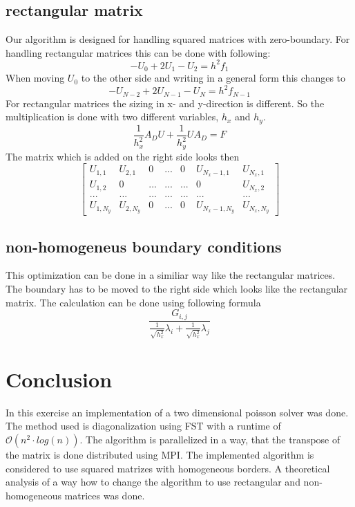 \documentclass{article}
\begin{document}
\subsection{rectangular matrix}
Our algorithm is designed for handling squared matrices with zero-boundary. For handling rectangular matrices this can be done with following:
\begin{equation}
-U_0+2U_1-U_2=h^2f_1
\end{equation}
When moving $U_0$ to the other side and writing in a general form this changes to
\begin{equation}
-U_{N-2}+2U_{N-1}-U_N=h^2f_{N-1}
\end{equation}
For rectangular matrices the sizing in x- and y-direction is different. So the multiplication is done with two different variables, $h_x$ and $h_y$.
\begin{equation}
\frac{1}{h_x^2}A_DU+\frac{1}{h_y^2}UA_D=F
\end{equation}
The matrix which is added on the right side looks then
$$
\begin{bmatrix}
U_{1,1} & U_{2,1} & 0 & ... & 0 & U_{N_x-1,1} & U_{N_x,1} \\
U_{1,2} & 0 & ... & ... & ... & 0 & U_{N_x,2} \\
... & ... & ... & ... &... & ... & ... \\
U_{1,N_y} & U_{2,N_y} & 0 & ... & 0 & U_{N_x-1,N_y} & U_{N_x,N_y} 
\end{bmatrix}
$$
\subsection{non-homogeneus boundary conditions}
This optimization can be done in a similiar way like the rectangular matrices. The boundary has to be moved to the right side which looks like the rectangular matrix. The calculation can be done using following formula
\begin{equation}
\frac{G_{i,j}}{\frac{1}{\sqrt{h_x^2}}\lambda_i+\frac{1}{\sqrt{h_x^2}}\lambda_j}
\end{equation}
\newpage
\section{Conclusion}
In this exercise an implementation of a two dimensional poisson solver was done. The method used is diagonalization using FST with a runtime of $\mathcal{O}(n^2\cdot log(n))$. The algorithm is parallelized in a way, that the transpose of the matrix is done distributed using MPI. The implemented algorithm is considered to use squared matrizes with homogeneous borders. A theoretical analysis of a way how to change the algorithm to use rectangular and non-homogeneous matrices was done.
\end{document}
